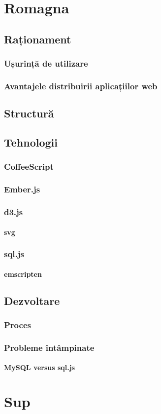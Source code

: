 \documentclass[12pt, a4paper, twoside, romanian]{teza-upb}
\begin{document}
\chapter{Romagna}
  \section{Raționament}

    \subsection{Ușurință de utilizare}

    \subsection{Avantajele distribuirii aplicațiilor web}
  \section{Structură}
  \section{Tehnologii}
    \subsection{CoffeeScript}
    \subsection{Ember.js}
    \subsection{d3.js}
      \subsubsection{svg}
    \subsection{sql.js}
      \subsubsection{emscripten}


  \section{Dezvoltare}

    \subsection{Proces}

    \subsection{Probleme întâmpinate}
      \subsubsection{MySQL versus sql.js} %
      \label{ssub:MySQL versus sql.js}




\appendix
\chapter {Sup}
\end{document}
